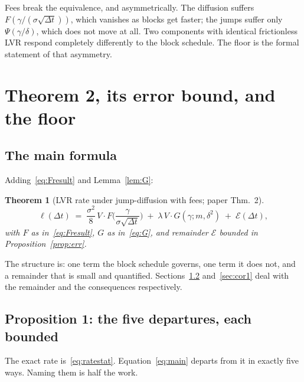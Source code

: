 \documentclass[11pt]{article}
\newtheorem{theorem}{Theorem}
\theoremstyle{definition}
\theoremstyle{remark}
\newcommand{\dt}{\Delta t}
\newcommand{\1}{\mathbf{1}}
\begin{document}
Fees break the equivalence, and asymmetrically. The diffusion suffers $F(\gamma/(\sigma\sqrt{\dt}))$, which vanishes as blocks get faster; the jumps suffer only $\Psi(\gamma/\delta)$, which does not move at all. Two components with identical frictionless LVR respond completely differently to the block schedule. The floor is the formal statement of that asymmetry.

\section{Theorem 2, its error bound, and the floor}\label{sec:thm2}

\subsection{The main formula}

Adding~\eqref{eq:Fresult} and Lemma~\ref{lem:G}:

\begin{theorem}[LVR rate under jump-diffusion with fees; paper Thm.~2]\label{thm:2}
\begin{equation}\label{eq:main}
\boxed{\;\ell(\dt) \;=\; \frac{\sigma^2}{8}\,V\cdot F\!\Big(\frac{\gamma}{\sigma\sqrt{\dt}}\Big)
\;+\; \lambda\,V\cdot G(\gamma;m,\delta^2)
\;+\; \mathcal E(\dt), \;}
\end{equation}
with $F$ as in~\eqref{eq:Fresult}, $G$ as in~\eqref{eq:G}, and remainder $\mathcal E$ bounded in Proposition~\ref{prop:err}.
\end{theorem}

The structure is: one term the block schedule governs, one term it does not, and a remainder that is small and quantified. Sections~\ref{sec:prop1} and~\ref{sec:cor1} deal with the remainder and the consequences respectively.

\subsection{Proposition 1: the five departures, each bounded}\label{sec:prop1}

The exact rate is~\eqref{eq:ratestat}. Equation~\eqref{eq:main} departs from it in exactly five ways. Naming them is half the work.
\end{document}
